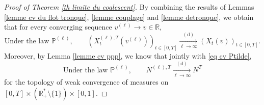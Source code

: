 \documentclass[11pt]{article}
\numberwithin{equation}{section}
\def \R{\mathbb {R}}
\def\P{\mathbb{P}}
\begin{document}
\begin{proof}[Proof of Theorem \ref{th limite du coalescent}]
	By combining the results of Lemmas \ref{lemme cv du flot tronque}, \ref{lemme couplage} and \ref{lemme detronque}, we obtain that for every converging sequence $v^{(\ell)} \to v \in \R$,
	$$
	\text{Under the law }\P^{(\ell)}, \qquad
	\left( X^{(\ell),T}_t(v^{(\ell)}) \right)_{t \in [0,T]}
	\mathop{\longrightarrow}\limits_{\ell \to \infty}^{(\mathrm{d})}
	\left(
	X_t(v)
	\right)_{t\in [0,T]}.
	$$
	Moreover, by Lemma \ref{lemme cv ppp}, we know that jointly with \eqref{eq cv Ptilde},
	$$
	\text{Under the law }\P^{(\ell)}, \qquad
	N^{(\ell),T}
	\mathop{\longrightarrow}\limits_{\ell \to \infty}^{(\mathrm{d})}
	N^T
	$$
	for the topology of weak convergence of measures on $[0,T]\times(\R^*_+\setminus\{1\}) \times [0,1]$. 
	

\end{proof}
\end{document}

